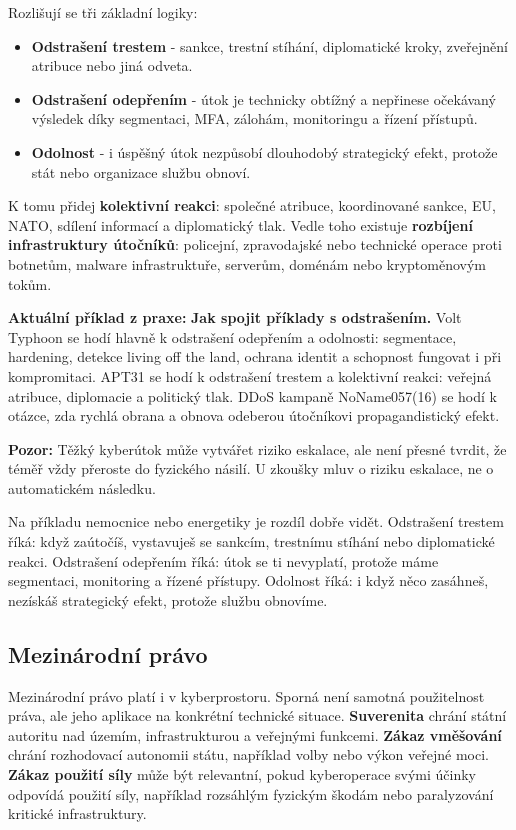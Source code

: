 \documentclass[11pt,a4paper]{article}
\newcommand{\pozor}[1]{\begin{tcolorbox}[breakable,enhanced,colback=red!7,colframe=red!30!black,boxrule=0pt,arc=1mm,left=5pt,right=5pt,top=5pt,bottom=5pt,before skip=6pt,after skip=6pt]\textbf{Pozor:} #1\end{tcolorbox}}
\newcommand{\aktualni}[1]{\begin{tcolorbox}[breakable,enhanced,colback=green!10,colframe=green!35!black,boxrule=0pt,arc=1mm,left=5pt,right=5pt,top=5pt,bottom=5pt,before skip=6pt,after skip=6pt]\textbf{Aktuální příklad z praxe:} #1\end{tcolorbox}}
\begin{document}
Rozlišují se tři základní logiky:
\begin{itemize}
  \item \textbf{Odstrašení trestem} - sankce, trestní stíhání, diplomatické kroky, zveřejnění atribuce nebo jiná odveta.
  \item \textbf{Odstrašení odepřením} - útok je technicky obtížný a nepřinese očekávaný výsledek díky segmentaci, MFA, zálohám, monitoringu a řízení přístupů.
  \item \textbf{Odolnost} - i úspěšný útok nezpůsobí dlouhodobý strategický efekt, protože stát nebo organizace službu obnoví.
\end{itemize}

K tomu přidej \textbf{kolektivní reakci}: společné atribuce, koordinované sankce, EU, NATO, sdílení informací a diplomatický tlak. Vedle toho existuje \textbf{rozbíjení infrastruktury útočníků}: policejní, zpravodajské nebo technické operace proti botnetům, malware infrastruktuře, serverům, doménám nebo kryptoměnovým tokům.

\aktualni{\textbf{Jak spojit příklady s odstrašením.} Volt Typhoon se hodí hlavně k odstrašení odepřením a odolnosti: segmentace, hardening, detekce living off the land, ochrana identit a schopnost fungovat i při kompromitaci. APT31 se hodí k odstrašení trestem a kolektivní reakci: veřejná atribuce, diplomacie a politický tlak. DDoS kampaně NoName057(16) se hodí k otázce, zda rychlá obrana a obnova odeberou útočníkovi propagandistický efekt.}

\pozor{Těžký kyberútok může vytvářet riziko eskalace, ale není přesné tvrdit, že téměř vždy přeroste do fyzického násilí. U zkoušky mluv o riziku eskalace, ne o automatickém následku.}

Na příkladu nemocnice nebo energetiky je rozdíl dobře vidět. Odstrašení trestem říká: když zaútočíš, vystavuješ se sankcím, trestnímu stíhání nebo diplomatické reakci. Odstrašení odepřením říká: útok se ti nevyplatí, protože máme segmentaci, monitoring a řízené přístupy. Odolnost říká: i když něco zasáhneš, nezískáš strategický efekt, protože službu obnovíme.

\subsection*{Mezinárodní právo}
Mezinárodní právo platí i v kyberprostoru. Sporná není samotná použitelnost práva, ale jeho aplikace na konkrétní technické situace. \textbf{Suverenita} chrání státní autoritu nad územím, infrastrukturou a veřejnými funkcemi. \textbf{Zákaz vměšování} chrání rozhodovací autonomii státu, například volby nebo výkon veřejné moci. \textbf{Zákaz použití síly} může být relevantní, pokud kyberoperace svými účinky odpovídá použití síly, například rozsáhlým fyzickým škodám nebo paralyzování kritické infrastruktury.
\end{document}
